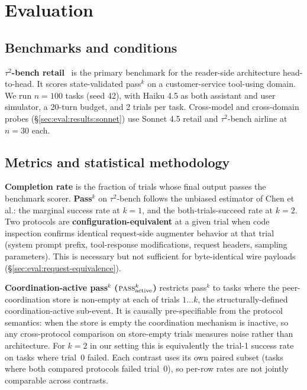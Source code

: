\section{Evaluation}
\label{sec:evaluation}

\subsection{Benchmarks and conditions}
\label{sec:eval:benchmarks}
\label{sec:eval:conditions}
\label{sec:eval:ablations}

\textbf{$\tau^2$-bench retail}~\cite{tau2bench2025} is the
primary benchmark for the reader-side architecture head-to-head.
It scores state-validated pass$^k$ on a customer-service
tool-using domain.  We run $n{=}100$ tasks (seed 42), with Haiku
4.5 as both assistant and user simulator, a 20-turn budget, and
2 trials per task.  Cross-model and cross-domain probes
(\S\ref{sec:eval:results:sonnet}) use Sonnet 4.5 retail and
$\tau^2$-bench airline at $n{=}30$ each.

\subsection{Metrics and statistical methodology}
\label{sec:eval:metrics}
\label{sec:eval:stats}

\textbf{Completion rate} is the fraction of trials whose final
output passes the benchmark scorer.  \textbf{Pass$^k$} on
$\tau^2$-bench follows the unbiased estimator of Chen et al.: the
marginal success rate at $k{=}1$, and the both-trials-succeed
rate at $k{=}2$.  Two protocols are
\textbf{configuration-equivalent} at a given trial when code
inspection confirms identical request-side augmenter behavior at
that trial (system prompt prefix, tool-response modifications,
request headers, sampling parameters).  This is necessary but not
sufficient for byte-identical wire payloads
(\S\ref{sec:eval:request-equivalence}).

\textbf{Coordination-active pass$^k$
($\textsc{pass}^k_{\mathrm{active}}$)} restricts pass$^k$ to tasks
where the peer-coordination store is non-empty at each of trials
$1\!\ldots\!k$, the structurally-defined coordination-active
sub-event. It is causally pre-specifiable from the protocol
semantics: when the store is empty the coordination mechanism is
inactive, so any cross-protocol comparison on store-empty trials
measures noise rather than architecture. For $k{=}2$ in our
setting this is equivalently the trial-1 success rate on tasks
where trial~0 failed. Each contrast uses its own paired subset
(tasks where both compared protocols failed trial~0), so per-row
rates are not jointly comparable across contrasts.

